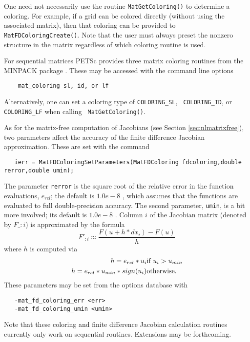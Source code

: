 One need not necessarily use the routine {\tt MatGetColoring()} to
determine a coloring.  For example, if a grid can be colored directly
(without using the associated matrix), then that coloring can be provided
to {\tt MatFDColoringCreate()}.  Note that the user must always
preset the nonzero structure in the matrix regardless of which
coloring routine is used.

For sequential matrices PETSc provides three matrix coloring routines from the 
MINPACK package \cite{more84}. These may be accessed with the command line options
\begin{verbatim}
   -mat_coloring sl, id, or lf
\end{verbatim}
Alternatively, one can set a coloring type of {\tt COLORING\_SL}, {\tt
COLORING\_ID}, or {\tt COLORING\_LF} when calling {\tt
MatGetColoring()}.   

As for the matrix-free computation of Jacobians (see Section
\ref{sec:nlmatrixfree}), two parameters affect the accuracy of the
finite difference Jacobian approximation.  These are set with the command
\begin{verbatim}
   ierr = MatFDColoringSetParameters(MatFDColoring fdcoloring,double rerror,double umin);
\end{verbatim}
The parameter {\tt rerror} is the square root of 
the relative error in the function evaluations, $e_{rel}$; the default is $ 1.0e-8 $ , which assumes
that the functions are evaluated to full double-precision accuracy. The 
second parameter, {\tt umin}, is a bit more involved; its default is 
$ 1.0e-8 $ .  Column $i$ of the Jacobian matrix (denoted by $F\_{:i}$) is 
approximated by the formula
\[
    F'_{:i} \approx \frac{F(u + h*dx_{i}) - F(u)}{h}
\]
where $ h $ is computed via 
\begin{eqnarray*}
        h = e_{rel}*u_{i}             &    \hbox{if }  u_{i} > u_{min} \\
        h = e_{rel}*u_{min}*sign(u_{i})  &    \hbox{otherwise}.
\end{eqnarray*}
These parameters may be set from the options database with 
\begin{verbatim}
   -mat_fd_coloring_err <err>
   -mat_fd_coloring_umin <umin>
\end{verbatim}
 

Note that these coloring and finite difference Jacobian calculation routines currently 
only work on sequential routines.  Extensions may be forthcoming.


